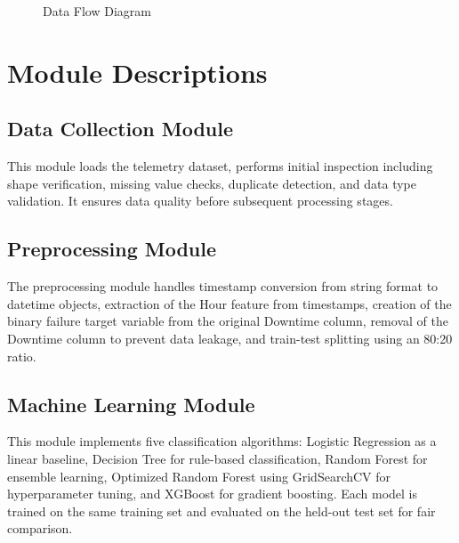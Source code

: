 \documentclass[12pt,letterpaper]{report}
\begin{document}
\begin{figure}[H]
\centering
{}
\caption{Data Flow Diagram}
\label{fig:dataflow}
\end{figure}

\section{Module Descriptions}

\subsection{Data Collection Module}
This module loads the telemetry dataset, performs initial inspection including shape verification, missing value checks, duplicate detection, and data type validation. It ensures data quality before subsequent processing stages.

\subsection{Preprocessing Module}
The preprocessing module handles timestamp conversion from string format to datetime objects, extraction of the Hour feature from timestamps, creation of the binary failure target variable from the original Downtime column, removal of the Downtime column to prevent data leakage, and train-test splitting using an 80:20 ratio.

\subsection{Machine Learning Module}
This module implements five classification algorithms: Logistic Regression as a linear baseline, Decision Tree for rule-based classification, Random Forest for ensemble learning, Optimized Random Forest using GridSearchCV for hyperparameter tuning, and XGBoost for gradient boosting. Each model is trained on the same training set and evaluated on the held-out test set for fair comparison.
\end{document}

